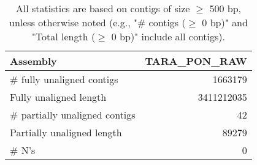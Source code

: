 \documentclass[12pt,a4paper]{article}
\begin{document}
\begin{table}[ht]
\begin{center}
\caption{All statistics are based on contigs of size $\geq$ 500 bp, unless otherwise noted (e.g., "\# contigs ($\geq$ 0 bp)" and "Total length ($\geq$ 0 bp)" include all contigs).}
\begin{tabular}{|l*{1}{|r}|}
\hline
Assembly & TARA\_PON\_RAW \\ \hline
\# fully unaligned contigs & 1663179 \\ \hline
Fully unaligned length & 3411212035 \\ \hline
\# partially unaligned contigs & 42 \\ \hline
Partially unaligned length & 89279 \\ \hline
\# N's & 0 \\ \hline
\end{tabular}
\end{center}
\end{table}
\end{document}
